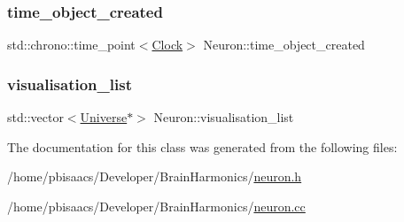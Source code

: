 \mbox{\label{classNeuron_aac5b1f8a26738f915778ebf25183f258}} 
\subsubsection{\texorpdfstring{time\+\_\+object\+\_\+created}{time\_object\_created}}
{\footnotesize\ttfamily std\+::chrono\+::time\+\_\+point$<$\mbox{\hyperlink{universe_8h_a0ef8d951d1ca5ab3cfaf7ab4c7a6fd80}{Clock}}$>$ Neuron\+::time\+\_\+object\+\_\+created\hspace{0.3cm}{\ttfamily [private]}}

\mbox{\label{classNeuron_a00b1e2e5f9d224759df1aa54093092ba}} 
\subsubsection{\texorpdfstring{visualisation\+\_\+list}{visualisation\_list}}
{\footnotesize\ttfamily std\+::vector$<$\mbox{\hyperlink{classUniverse}{Universe}}$\ast$$>$ Neuron\+::visualisation\+\_\+list\hspace{0.3cm}{\ttfamily [protected]}}



The documentation for this class was generated from the following files\+:\begin{DoxyCompactItemize}
\item 
/home/pbisaacs/\+Developer/\+Brain\+Harmonics/\mbox{\hyperlink{neuron_8h}{neuron.\+h}}\item 
/home/pbisaacs/\+Developer/\+Brain\+Harmonics/\mbox{\hyperlink{neuron_8cc}{neuron.\+cc}}\end{DoxyCompactItemize}
